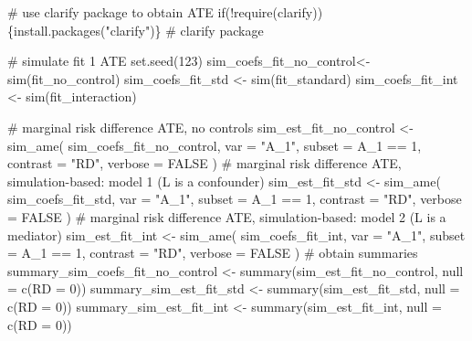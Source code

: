 \documentclass[
  singlecolumn]{article}
\newenvironment{Shaded}{}{}
\newcommand{\AttributeTok}[1]{\textcolor[rgb]{0.84,0.23,0.29}{#1}}
\newcommand{\CommentTok}[1]{\textcolor[rgb]{0.42,0.45,0.49}{#1}}
\newcommand{\ConstantTok}[1]{\textcolor[rgb]{0.00,0.36,0.77}{#1}}
\newcommand{\ControlFlowTok}[1]{\textcolor[rgb]{0.84,0.23,0.29}{#1}}
\newcommand{\DecValTok}[1]{\textcolor[rgb]{0.00,0.36,0.77}{#1}}
\newcommand{\FunctionTok}[1]{\textcolor[rgb]{0.44,0.26,0.76}{#1}}
\newcommand{\NormalTok}[1]{\textcolor[rgb]{0.14,0.16,0.18}{#1}}
\newcommand{\OtherTok}[1]{\textcolor[rgb]{0.44,0.26,0.76}{#1}}
\newcommand{\SpecialCharTok}[1]{\textcolor[rgb]{0.00,0.36,0.77}{#1}}
\newcommand{\StringTok}[1]{\textcolor[rgb]{0.01,0.18,0.38}{#1}}
\begin{document}
\begin{Shaded}
\begin{Highlighting}[]
\CommentTok{\# use \textasciigrave{}clarify\textasciigrave{} package to obtain ATE}
\ControlFlowTok{if}\NormalTok{(}\SpecialCharTok{!}\FunctionTok{require}\NormalTok{(clarify))\{}\FunctionTok{install.packages}\NormalTok{(}\StringTok{"clarify"}\NormalTok{)\} }\CommentTok{\# clarify package}

\CommentTok{\# simulate fit 1 ATE}
\FunctionTok{set.seed}\NormalTok{(}\DecValTok{123}\NormalTok{)}
\NormalTok{sim\_coefs\_fit\_no\_control}\OtherTok{\textless{}{-}} \FunctionTok{sim}\NormalTok{(fit\_no\_control)  }
\NormalTok{sim\_coefs\_fit\_std }\OtherTok{\textless{}{-}} \FunctionTok{sim}\NormalTok{(fit\_standard)}
\NormalTok{sim\_coefs\_fit\_int }\OtherTok{\textless{}{-}} \FunctionTok{sim}\NormalTok{(fit\_interaction)}

\CommentTok{\# marginal risk difference ATE, no controls}
\NormalTok{sim\_est\_fit\_no\_control }\OtherTok{\textless{}{-}}
  \FunctionTok{sim\_ame}\NormalTok{(}
\NormalTok{    sim\_coefs\_fit\_no\_control,}
    \AttributeTok{var =} \StringTok{"A\_1"}\NormalTok{,}
    \AttributeTok{subset =}\NormalTok{ A\_1 }\SpecialCharTok{==} \DecValTok{1}\NormalTok{,}
    \AttributeTok{contrast =} \StringTok{"RD"}\NormalTok{,}
    \AttributeTok{verbose =} \ConstantTok{FALSE}
\NormalTok{  )}
\CommentTok{\# marginal risk difference ATE, simulation{-}based: model 1 (L is a confounder)}
\NormalTok{sim\_est\_fit\_std }\OtherTok{\textless{}{-}}
  \FunctionTok{sim\_ame}\NormalTok{(}
\NormalTok{    sim\_coefs\_fit\_std,}
    \AttributeTok{var =} \StringTok{"A\_1"}\NormalTok{,}
    \AttributeTok{subset =}\NormalTok{ A\_1 }\SpecialCharTok{==} \DecValTok{1}\NormalTok{,}
    \AttributeTok{contrast =} \StringTok{"RD"}\NormalTok{,}
    \AttributeTok{verbose =} \ConstantTok{FALSE}
\NormalTok{  )}
\CommentTok{\# marginal risk difference ATE, simulation{-}based: model 2 (L is a mediator)}
\NormalTok{sim\_est\_fit\_int }\OtherTok{\textless{}{-}}
  \FunctionTok{sim\_ame}\NormalTok{(}
\NormalTok{    sim\_coefs\_fit\_int,}
    \AttributeTok{var =} \StringTok{"A\_1"}\NormalTok{,}
    \AttributeTok{subset =}\NormalTok{ A\_1 }\SpecialCharTok{==} \DecValTok{1}\NormalTok{,}
    \AttributeTok{contrast =} \StringTok{"RD"}\NormalTok{,}
    \AttributeTok{verbose =} \ConstantTok{FALSE}
\NormalTok{  )}
\CommentTok{\# obtain summaries}
\NormalTok{summary\_sim\_coefs\_fit\_no\_control }\OtherTok{\textless{}{-}}
  \FunctionTok{summary}\NormalTok{(sim\_est\_fit\_no\_control, }\AttributeTok{null =} \FunctionTok{c}\NormalTok{(}\StringTok{\textasciigrave{}}\AttributeTok{RD}\StringTok{\textasciigrave{}} \OtherTok{=} \DecValTok{0}\NormalTok{))}
\NormalTok{summary\_sim\_est\_fit\_std }\OtherTok{\textless{}{-}}
  \FunctionTok{summary}\NormalTok{(sim\_est\_fit\_std, }\AttributeTok{null =} \FunctionTok{c}\NormalTok{(}\StringTok{\textasciigrave{}}\AttributeTok{RD}\StringTok{\textasciigrave{}} \OtherTok{=} \DecValTok{0}\NormalTok{))}
\NormalTok{summary\_sim\_est\_fit\_int }\OtherTok{\textless{}{-}}
  \FunctionTok{summary}\NormalTok{(sim\_est\_fit\_int, }\AttributeTok{null =} \FunctionTok{c}\NormalTok{(}\StringTok{\textasciigrave{}}\AttributeTok{RD}\StringTok{\textasciigrave{}} \OtherTok{=} \DecValTok{0}\NormalTok{))}


\end{Highlighting}
\end{Shaded}
\end{document}
